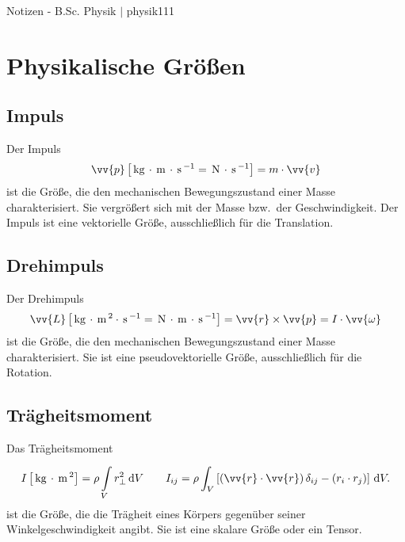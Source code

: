\documentclass[a4paper,12pt]{article}
\newcommand{\td}{\,\text{d}}
\begin{document}

\thispagestyle{empty}
\hfill
\Huge
\begin{center}
        Notizen - B.Sc. Physik $|$ physik111
\end{center}
\normalsize
\hfill


\newpage


\tableofcontents


\newpage



\section{Physikalische Größen}
\subsection{Impuls}
Der Impuls
\[ 
        \vv{p}\left[\,\text{kg}\,\cdot \,\text{m}\, \cdot \,\text{s}\, ^{-1}=\,\text{N}\,\cdot \,\text{s}\, ^{-1}\right]=m\cdot \vv{v} 
\] 
ist die Größe, die den mechanischen Bewegungszustand einer Masse charakterisiert. Sie vergrößert sich mit der Masse bzw.\ der Geschwindigkeit. Der Impuls ist eine vektorielle Größe, ausschließlich für die Translation.

\subsection{Drehimpuls}
Der Drehimpuls
\[ 
        \vv{L}\left[\,\text{kg}\,\cdot \,\text{m}\,^2\cdot \,\text{s}\, ^{-1}=\,\text{N}\,\cdot \,\text{m}\,\cdot \,\text{s}\, ^{-1}\right]=\vv{r}\times \vv{p}=I\cdot \vv{\omega }
\]
ist die Größe, die den mechanischen Bewegungszustand einer Masse charakterisiert. Sie ist eine pseudovektorielle Größe, ausschließlich für die Rotation.

\subsection{Trägheitsmoment}
Das Trägheitsmoment
\[ 
        I\left[\,\text{kg}\,\cdot \,\text{m}\,^2\right]=\rho \int\limits_{V}^{}r_\perp^2\td V\qquad I_{ij}=\rho \int_{V}^{}\left[\left(\vv{r}\cdot \vv{r}\right)\delta _{ij}-\left(r_i\cdot r_j\right)\right]\td V
.\] 
ist die Größe, die die Trägheit eines Körpers gegenüber seiner Winkelgeschwindigkeit angibt. Sie ist eine skalare Größe oder ein Tensor.
\end{document}
